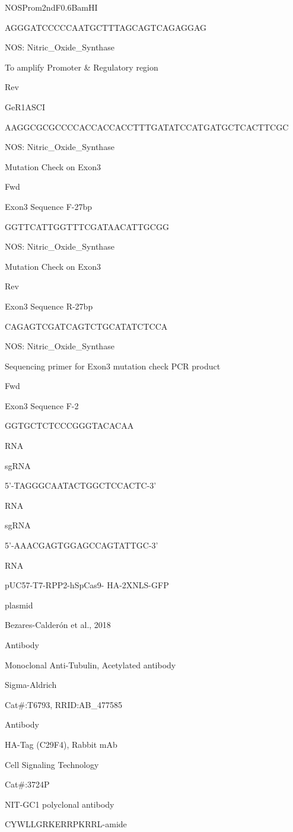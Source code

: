 \documentclass[
  10pt,
  onecolumn]{article}
\begin{document}
NOSProm2ndF0.6BamHI

AGGGATCCCCCAATGCTTTAGCAGTCAGAGGAG

NOS: Nitric\_Oxide\_Synthase

To amplify Promoter \& Regulatory region

Rev

GeR1ASCI

AAGGCGCGCCCCACCACCACCTTTGATATCCATGATGCTCACTTCGC

NOS: Nitric\_Oxide\_Synthase

Mutation Check on Exon3

Fwd

Exon3 Sequence F-27bp

GGTTCATTGGTTTCGATAACATTGCGG

NOS: Nitric\_Oxide\_Synthase

Mutation Check on Exon3

Rev

Exon3 Sequence R-27bp

CAGAGTCGATCAGTCTGCATATCTCCA

NOS: Nitric\_Oxide\_Synthase

Sequencing primer for Exon3 mutation check PCR product

Fwd

Exon3 Sequence F-2

GGTGCTCTCCCGGGTACACAA

RNA

sgRNA

5'-TAGGGCAATACTGGCTCCACTC-3'

RNA

sgRNA

5'-AAACGAGTGGAGCCAGTATTGC-3'

RNA

pUC57-T7-RPP2-hSpCas9- HA-2XNLS-GFP

plasmid

Bezares-Calderón et al., 2018

Antibody

Monoclonal Anti-Tubulin, Acetylated antibody

Sigma-Aldrich

Cat\#:T6793, RRID:AB\_477585

Antibody

HA-Tag (C29F4), Rabbit mAb

Cell Signaling Technology

Cat\#:3724P

NIT-GC1 polyclonal antibody

CYWLLGRKERRPKRRL-amide
\end{document}
